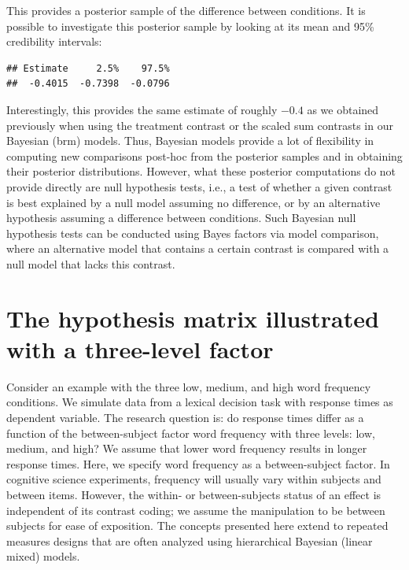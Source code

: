 \documentclass[12pt,]{krantz}
\newenvironment{Shaded}{\begin{snugshade}}{\end{snugshade}}
\newcommand{\KeywordTok}[1]{\textcolor[rgb]{0.13,0.29,0.53}{\textbf{#1}}}
\newcommand{\DataTypeTok}[1]{\textcolor[rgb]{0.13,0.29,0.53}{#1}}
\newcommand{\FloatTok}[1]{\textcolor[rgb]{0.00,0.00,0.81}{#1}}
\newcommand{\OperatorTok}[1]{\textcolor[rgb]{0.81,0.36,0.00}{\textbf{#1}}}
\newcommand{\NormalTok}[1]{#1}
\theoremstyle{definition}
\theoremstyle{definition}
\theoremstyle{definition}
\theoremstyle{remark}
\begin{document}
This provides a posterior sample of the difference between conditions.
It is possible to investigate this posterior sample by looking at its
mean and 95\% credibility intervals:

\begin{Shaded}
\end{Shaded}

\begin{verbatim}
## Estimate     2.5%    97.5% 
##  -0.4015  -0.7398  -0.0796
\end{verbatim}

Interestingly, this provides the same estimate of roughly \(-0.4\) as we
obtained previously when using the treatment contrast or the scaled sum
contrasts in our Bayesian (brm) models. Thus, Bayesian models provide a
lot of flexibility in computing new comparisons post-hoc from the
posterior samples and in obtaining their posterior distributions.
However, what these posterior computations do not provide directly are
null hypothesis tests, i.e., a test of whether a given contrast is best
explained by a null model assuming no difference, or by an alternative
hypothesis assuming a difference between conditions. Such Bayesian null
hypothesis tests can be conducted using Bayes factors via model
comparison, where an alternative model that contains a certain contrast
is compared with a null model that lacks this contrast.

\section{The hypothesis matrix illustrated with a three-level
factor}\label{the-hypothesis-matrix-illustrated-with-a-three-level-factor}

Consider an example with the three low, medium, and high word frequency
conditions. We simulate data from a lexical decision task with response
times as dependent variable. The research question is: do response times
differ as a function of the between-subject factor word frequency with
three levels: low, medium, and high? We assume that lower word frequency
results in longer response times. Here, we specify word frequency as a
between-subject factor. In cognitive science experiments, frequency will
usually vary within subjects and between items. However, the within- or
between-subjects status of an effect is independent of its contrast
coding; we assume the manipulation to be between subjects for ease of
exposition. The concepts presented here extend to repeated measures
designs that are often analyzed using hierarchical Bayesian (linear
mixed) models.
\end{document}

